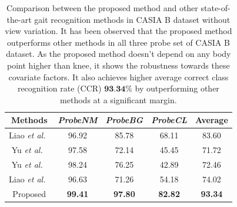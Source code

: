 \begin{table}[t]
	\caption{Comparison between the proposed method and other state-of-the-art gait recognition methods in CASIA B dataset without view variation. It has been observed that the proposed method outperforms other methods in all three probe set of CASIA B dataset. As the proposed method doesn't depend on any body point higher than knee, it shows the robustness towards these covariate factors. It also achieves higher average correct class recognition rate (CCR) $\textbf{93.34\%}$ by outperforming other methods at a significant margin. \label{table:comp_casia_b_without_view}}
	
	{\begin{tabular*}{20pc}{@{\extracolsep{\fill}}ccccc}\hline
			
			Methods &\textit{ProbeNM} &\textit{ProbeBG} &\textit{ProbeCL} &Average\\
			\hline
			
			Liao \textit{et al.}~\cite{Liao_19} &96.92 &85.78 &68.11 &83.60 \\ 
			
			\noalign{\smallskip}
			Yu \textit{et al.}~\cite{Yu_17_spae}  &97.58  &72.14 &45.45 &71.72 \\
			
			\noalign{\smallskip}
			Yu \textit{et al.}~\cite{Yu_19} &98.24  &76.25  &42.89  &72.46 \\
			
			\noalign{\smallskip}
			Liao \textit{et al.}~\cite{Liao_19}  &96.63  &71.26  &54.18  &74.02 \\
			
			\noalign{\smallskip}
			Proposed &\textbf{99.41} &\textbf{97.80} &\textbf{82.82} &\textbf{93.34} \\
			\hline
	\end{tabular*}}{}
\end{table}

